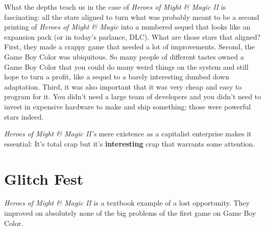 \documentclass{book}
\begin{document}
What the depths teach us in the case of \emph{Heroes of Might \& Magic II} is fascinating: all the stars aligned to turn what was probably meant to be a second printing of \emph{Heroes of Might \& Magic} into a numbered sequel that looks like an expansion pack (or in today’s parlance, DLC). What are those stars that aligned? First, they made a crappy game that needed a lot of improvements. Second, the Game Boy Color was ubiquitous. So many people of different tastes owned a Game Boy Color that you could do many weird things on the system and still hope to turn a profit, like a sequel to a barely interesting dumbed down adaptation. Third, it was also important that it was very cheap and easy to program for it. You didn’t need a large team of developers and you didn’t need to invest in expensive hardware to make and ship something; those were powerful stars indeed.\par
\emph{Heroes of Might \& Magic II’s} mere existence as a capitalist enterprise makes it essential: It’s total crap but it’s \textbf{interesting} crap that warrants some attention.\par
\FloatBarrier\section*{Glitch Fest}
\emph{Heroes of Might \& Magic II} is a textbook example of a lost opportunity. They improved on absolutely none of the big problems of the first game on Game Boy Color.\par
\end{document}
